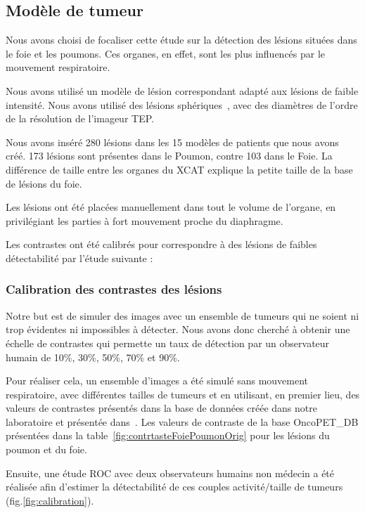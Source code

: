 \subsection{Modèle de tumeur}

Nous avons choisi de focaliser cette étude sur la détection des lésions situées dans le foie et les poumons. Ces organes, en effet, sont les plus influencés par le mouvement respiratoire.

Nous avons utilisé un modèle de lésion correspondant adapté aux lésions de faible intensité. Nous avons utilisé des lésions sphériques~\cite{bai2009regularized}, avec des diamètres de l'ordre de la résolution de l'imageur TEP.

Nous avons inséré 280 lésions dans les 15 modèles de patients que nous avons créé. 173 lésions sont présentes dans le Poumon, contre 103 dans le Foie. La différence de taille entre les organes du XCAT explique la petite taille de la base de lésions du foie. 

Les lésions ont été placées manuellement dans tout le volume de l'organe, en privilégiant les parties à fort mouvement proche du diaphragme. 

Les contrastes ont été calibrés pour correspondre à des lésions de faibles détectabilité par l'étude suivante :

\subsubsection{Calibration des contrastes des lésions}
\label{lab:etudeDetect}


Notre but est de simuler des images avec un ensemble de tumeurs qui ne soient ni trop évidentes ni impossibles à détecter. Nous avons donc cherché à obtenir une échelle de contrastes qui permette un taux de détection par un observateur humain de 10\%, 30\%, 50\%, 70\% et 90\%.

Pour réaliser cela, un ensemble d'images a été simulé sans mouvement respiratoire, avec différentes tailles de tumeurs et en utilisant, en premier lieu, des valeurs de contrastes présentés dans la base de données créée dans notre laboratoire et présentée dans~\cite{tomei2010oncopet_db}. Les valeurs de contraste de la base OncoPET\_DB présentées dans la table~\ref{fig:contrtasteFoiePoumonOrig} pour les lésions du poumon et du foie.


Ensuite, une étude ROC avec deux observateurs humains non médecin a été réalisée afin d'estimer la détectabilité de ces couples activité/taille de tumeurs (fig.\ref{fig:calibration}). 


